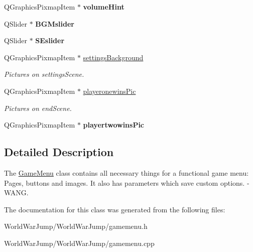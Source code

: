\begin{DoxyCompactItemize}
\item 
Q\+Graphics\+Pixmap\+Item $\ast$ {\bfseries volume\+Hint}\hypertarget{class_game_menu_a7ee482589366f76c2f28b85df5fe834a}{}\label{class_game_menu_a7ee482589366f76c2f28b85df5fe834a}

\item 
Q\+Slider $\ast$ {\bfseries B\+G\+Mslider}\hypertarget{class_game_menu_a2554f0222dad16e6943190265b4a063d}{}\label{class_game_menu_a2554f0222dad16e6943190265b4a063d}

\item 
Q\+Slider $\ast$ {\bfseries S\+Eslider}\hypertarget{class_game_menu_a1571c2f246e226b8fcc1ff927183d178}{}\label{class_game_menu_a1571c2f246e226b8fcc1ff927183d178}

\item 
Q\+Graphics\+Pixmap\+Item $\ast$ \hyperlink{class_game_menu_a1883be9e761bc6ddf651d076792a6536}{settings\+Background}\hypertarget{class_game_menu_a1883be9e761bc6ddf651d076792a6536}{}\label{class_game_menu_a1883be9e761bc6ddf651d076792a6536}

\begin{DoxyCompactList}\small\item\em Pictures on settings\+Scene. \end{DoxyCompactList}\item 
Q\+Graphics\+Pixmap\+Item $\ast$ \hyperlink{class_game_menu_a607f26f22eabdc52789ec0fcb9ae1fd8}{playeronewins\+Pic}\hypertarget{class_game_menu_a607f26f22eabdc52789ec0fcb9ae1fd8}{}\label{class_game_menu_a607f26f22eabdc52789ec0fcb9ae1fd8}

\begin{DoxyCompactList}\small\item\em Pictures on end\+Scene. \end{DoxyCompactList}\item 
Q\+Graphics\+Pixmap\+Item $\ast$ {\bfseries playertwowins\+Pic}\hypertarget{class_game_menu_a0aa1ea5e275d456d9eaaae032cbf798f}{}\label{class_game_menu_a0aa1ea5e275d456d9eaaae032cbf798f}

\end{DoxyCompactItemize}


\subsection{Detailed Description}
The \hyperlink{class_game_menu}{Game\+Menu} class contains all necessary things for a functional game menu\+: Pages, buttons and images. It also has parameters which save custom options. -\/ W\+A\+NG. 

The documentation for this class was generated from the following files\+:\begin{DoxyCompactItemize}
\item 
World\+War\+Jump/\+World\+War\+Jump/gamemenu.\+h\item 
World\+War\+Jump/\+World\+War\+Jump/gamemenu.\+cpp\end{DoxyCompactItemize}

